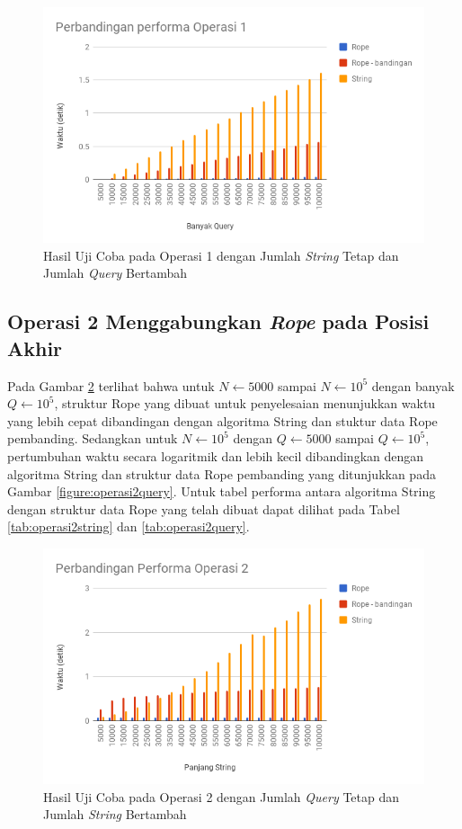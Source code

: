 \begin{figure}
\centerline{ \includegraphics[scale=0.45]{assets/images/operasi1-query.png}}
\caption{Hasil Uji Coba pada Operasi 1 dengan Jumlah \textit{String} Tetap dan Jumlah \textit{Query} Bertambah}
\label{figure:operasi1query}
\end{figure}

\subsection{Operasi 2 Menggabungkan \textit{Rope} pada Posisi Akhir}
Pada Gambar \ref{figure:operasi2string} terlihat bahwa untuk $N \gets 5000$ sampai $N \gets 10^5$ dengan banyak $Q \gets 10^5$, struktur Rope yang dibuat untuk penyelesaian \problem{} menunjukkan waktu yang lebih cepat dibandingan dengan algoritma String dan stuktur data Rope pembanding. Sedangkan untuk $N \gets 10^5$ dengan $Q \gets 5000$ sampai $Q \gets 10^5$, pertumbuhan waktu secara logaritmik dan lebih kecil dibandingkan dengan algoritma String dan struktur data Rope pembanding yang ditunjukkan pada Gambar \ref{figure:operasi2query}. Untuk tabel performa antara algoritma String dengan struktur data Rope yang telah dibuat dapat dilihat pada Tabel \ref{tab:operasi2string} dan \ref{tab:operasi2query}.
\begin{figure}
\centerline{ \includegraphics[scale=0.45]{assets/images/operasi2-string.png}}
\caption{Hasil Uji Coba pada Operasi 2 dengan Jumlah \textit{Query} Tetap dan Jumlah \textit{String} Bertambah}
\label{figure:operasi2string}
\end{figure}

